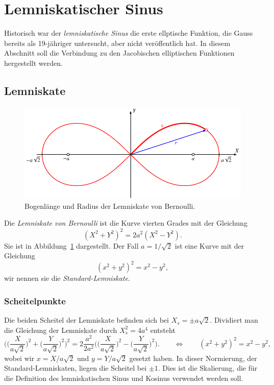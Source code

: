 %
%
%
\section{Lemniskatischer Sinus
\label{buch:elliptisch:section:lemniskate}}
Historisch war der {\em lemniskatische Sinus} die erste ellptische
Funktion, die Gauss bereits als 19-jähriger untersucht, aber nicht 
veröffentlich hat.
In diesem Abschnitt soll die Verbindung zu den Jacobischen
elliptischen Funktionen hergestellt werden.

%
%
\subsection{Lemniskate
\label{buch:gemotrie:subsection:lemniskate}}
\begin{figure}
\centering
\includegraphics{chapters/110-elliptisch/images/lemniskate.pdf}
\caption{Bogenlänge und Radius der Lemniskate von Bernoulli.
\label{buch:elliptisch:fig:lemniskate}}
\end{figure}
Die {\em Lemniskate von Bernoulli} ist die Kurve vierten Grades
mit der Gleichung
%
\begin{equation}
(X^2+Y^2)^2 = 2a^2(X^2-Y^2).
\label{buch:elliptisch:eqn:lemniskate}
\end{equation}
Sie ist in Abbildung~\ref{buch:elliptisch:fig:lemniskate}
dargestellt.
Der Fall $a=1/\!\sqrt{2}$ ist eine Kurve mit der Gleichung
\[
(x^2+y^2)^2 = x^2-y^2,
\]
wir nennen sie die {\em Standard-Lemniskate}.

\subsubsection{Scheitelpunkte}
Die beiden Scheitel der Lemniskate befinden sich bei $X_s=\pm a\!\sqrt{2}$.
Dividiert man die Gleichung der Lemniskate durch $X_s^2=4a^4$ entsteht 
\begin{equation}
\biggl(
\biggl(\frac{X}{a\!\sqrt{2}}\biggr)^2
+
\biggl(\frac{Y}{a\!\sqrt{2}}\biggr)^2
\biggr)^2
=
2\frac{a^2}{2a^2}\biggl(
\biggl(\frac{X}{a\!\sqrt{2}}\biggr)^2
-
\biggl(\frac{Y}{a\!\sqrt{2}}\biggr)^2
\biggr).
\qquad
\Leftrightarrow
\qquad
(x^2+y^2)^2 = x^2-y^2,
\label{buch:elliptisch:eqn:lemniskatenormiert}
\end{equation}
wobei wir $x=X/a\!\sqrt{2}$ und $y=Y/a\!\sqrt{2}$ gesetzt haben.
In dieser Normierung, der Standard-Lemniskaten, liegen die Scheitel
bei $\pm 1$.
Dies ist die Skalierung, die für die Definition des lemniskatischen
Sinus und Kosinus verwendet werden soll.

